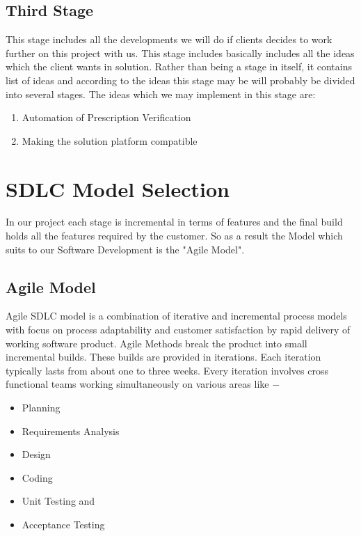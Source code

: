 \documentclass{article}
\begin{document}
\subsection{Third Stage}
This stage includes all the developments we will do if clients decides to work further on this project with us. This stage includes basically includes all the ideas which the client wants in solution. Rather than being a stage in itself, it contains list of ideas and according to the ideas this stage may be will probably be divided into several stages. The ideas which we may implement in this stage are:
\begin{enumerate}
\item Automation of Prescription Verification
\item Making the solution platform compatible
\end{enumerate}
\section{SDLC Model Selection}
In our project each stage is incremental in terms of features and the final build holds all the features required by the customer. So as a result the Model which suits to our Software Development is the "Agile Model".
\subsection{Agile Model}
Agile SDLC model is a combination of iterative and incremental process models with focus on process adaptability and customer satisfaction by rapid delivery of working software product. Agile Methods break the product into small incremental builds. These builds are provided in iterations. Each iteration typically lasts from about one to three weeks. Every iteration involves cross functional teams working simultaneously on various areas like −
\begin{itemize}

\item    Planning
\item    Requirements Analysis
\item    Design
\item    Coding
\item    Unit Testing and
\item    Acceptance Testing

\end{itemize}
\end{document}
